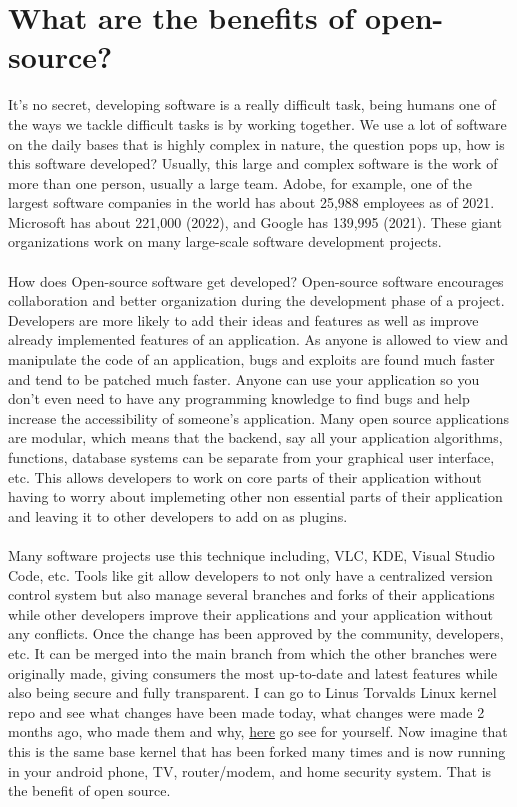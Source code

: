\documentclass{article}
\begin{document}
\section*{What are the benefits of open-source?}
It's no secret, developing software is a really difficult task, being humans one of the ways we tackle difficult tasks is by working together. We use a lot of software on the daily bases that is highly complex in nature, the question pops up, how is this software developed? Usually, this large and complex software is the work of more than one person, usually a large team. Adobe, for example, one of the largest software companies in the world has about 25,988 employees as of 2021. Microsoft has about 221,000 (2022), and Google has 139,995 (2021). These giant organizations work on many large-scale software development projects. 
\\\\
How does Open-source software get developed? Open-source software encourages collaboration and better organization during the development phase of a project. Developers are more likely to add their ideas and features as well as improve already implemented features of an application. As anyone is allowed to view and manipulate the code of an application, bugs and exploits are found much faster and tend to be patched much faster. Anyone can use your application so you don't even need to have any programming knowledge to find bugs and help increase the accessibility of someone's application. Many open source applications are modular, which means that the backend, say all your application algorithms, functions, database systems can be separate from your graphical user interface, etc. This allows developers to work on core parts of their application without having to worry about implemeting other non essential parts of their application and leaving it to other developers to add on as plugins. 
\\\\
Many software projects use this technique including, VLC, KDE, Visual Studio Code, etc. Tools like git allow developers to not only have a centralized version control system but also manage several branches and forks of their applications while other developers improve their applications and your application without any conflicts. Once the change has been approved by the community, developers, etc. It can be merged into the main branch from which the other branches were originally made, giving consumers the most up-to-date and latest features while also being secure and fully transparent. I can go to Linus Torvalds Linux kernel repo and see what changes have been made today, what changes were made 2 months ago, who made them and why, \href{https://github.com/torvalds/linux}{here} go see for yourself. Now imagine that this is the same base kernel that has been forked many times and is now running in your android phone, TV, router/modem, and home security system. That is the benefit of open source.
\end{document}
